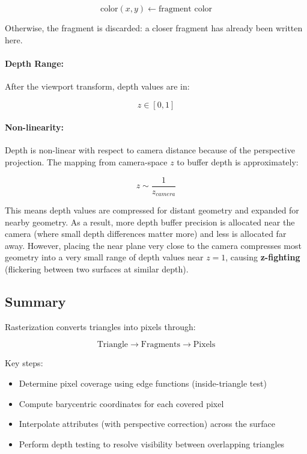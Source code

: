 \documentclass[11pt]{article}
\begin{document}
\begin{equation}
    \text{color}(x,y) \leftarrow \text{fragment color}
\end{equation}

Otherwise, the fragment is discarded: a closer fragment has already been written here.

\paragraph{Depth Range:}

After the viewport transform, depth values are in:

\begin{equation}
    z \in [0,1]
\end{equation}

\paragraph{Non-linearity:}

Depth is non-linear with respect to camera distance because of the perspective projection. The mapping from camera-space $z$ to buffer depth is approximately:

\begin{equation}
    z \sim \frac{1}{z_{camera}}
\end{equation}

This means depth values are compressed for distant geometry and expanded for nearby geometry. As a result, more depth buffer precision is allocated near the camera (where small depth differences matter more) and less is allocated far away. However, placing the near plane very close to the camera compresses most geometry into a very small range of depth values near $z = 1$, causing \textbf{z-fighting} (flickering between two surfaces at similar depth).

\subsection{Summary}

Rasterization converts triangles into pixels through:

\begin{equation}
    \text{Triangle} \rightarrow \text{Fragments} \rightarrow \text{Pixels}
\end{equation}

Key steps:

\begin{itemize}
    \item Determine pixel coverage using edge functions (inside-triangle test)
    \item Compute barycentric coordinates for each covered pixel
    \item Interpolate attributes (with perspective correction) across the surface
    \item Perform depth testing to resolve visibility between overlapping triangles
\end{itemize}
\end{document}
